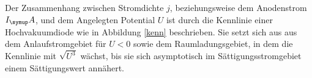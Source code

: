 Der Zusammenhang zwischen Stromdichte $j$, beziehungsweise dem Anodenstrom $I_\su{A}$,
und dem Angelegten Potential $U$ ist durch die Kennlinie einer Hochvakuumdiode
wie in Abbildung \ref{kenn} beschrieben.
Sie setzt sich aus aus dem Anlaufstromgebiet für $U<0$ sowie dem Raumladungsgebiet,
in dem die Kennlinie mit $\sqrt{U^3}$ wächst, bis sie sich asymptotisch im
Sättigungsstromgebiet einem Sättigungswert annähert.
\newpage
